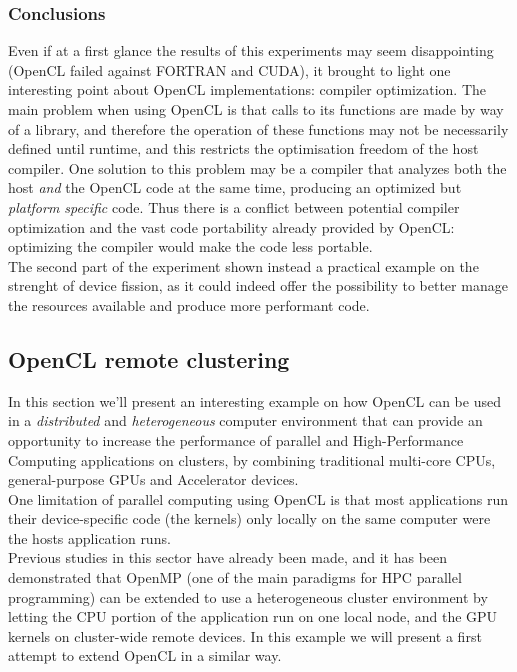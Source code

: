 \subsubsection{Conclusions}
Even if at a first glance the results of this experiments may seem disappointing (OpenCL failed against FORTRAN and CUDA),
it brought to light one interesting point about OpenCL implementations: compiler optimization.
The main problem when using OpenCL is that calls to its functions are made by way of a library, and therefore the operation of these functions may not be necessarily defined until runtime, and this restricts the optimisation freedom of the host compiler. One solution to this problem may be a compiler that analyzes both the host \emph{and} the OpenCL code at the same time, producing an optimized but \emph{platform specific} code. Thus there is a conflict between potential compiler optimization and the vast code portability already provided by OpenCL: optimizing the compiler would make the code less portable.\\
The second part of the experiment shown instead a practical example on the strenght of device fission, as it could indeed offer the possibility to better manage the resources available and produce more performant code.



\subsection{OpenCL remote clustering}
In this section we'll present an interesting example \cite{mosix:virtualcl} on how OpenCL can be used in a \emph{distributed} and \emph{heterogeneous} computer environment that can provide an opportunity to increase the performance of parallel and High-Performance Computing applications on clusters, by combining traditional multi-core CPUs, general-purpose GPUs and Accelerator devices.\\
One limitation of parallel computing using OpenCL is that most applications run their device-specific code (the kernels) only locally on the same computer were the hosts application runs.\\
Previous studies in this sector have already been made, and it has been demonstrated \cite{barak:heterogeneous} that OpenMP (one of the main paradigms for HPC parallel programming) can be extended to use a heterogeneous cluster environment by letting the CPU portion of the application run on one local node, and the GPU kernels on cluster-wide remote devices. In this example we will present a first attempt to extend OpenCL in a similar way.

